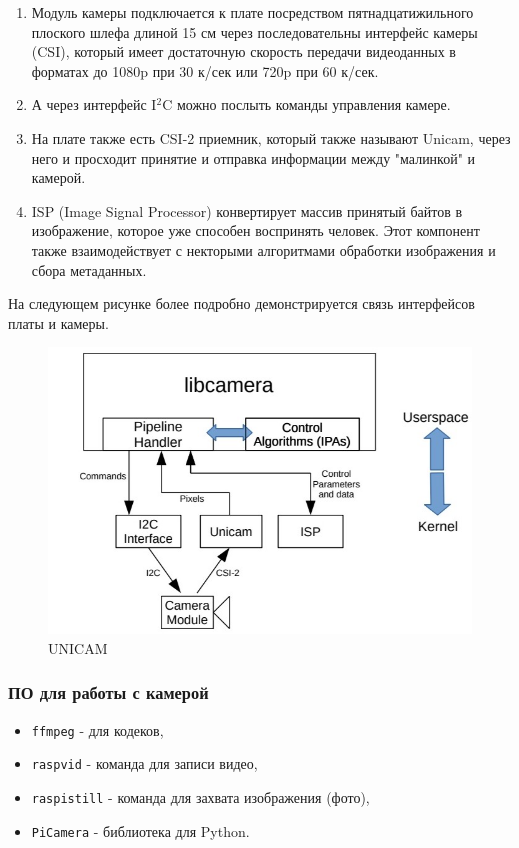 \documentclass[a4paper,11pt]{article}
\begin{document}
\begin{enumerate}
  \item Модуль камеры подключается к плате посредством пятнадцатижильного плоского шлефа длиной 15 см через последовательны интерфейс камеры (CSI), который имеет достаточную скорость передачи видеоданных в форматах до 1080p при 30 к/сек или 720p при 60 к/сек.
  \item А через интерфейс I$^2$C можно послыть команды управления камере.
  \item На плате также есть CSI-2 приемник, который также называют Unicam, через него и просходит принятие и отправка информации между "малинкой" и камерой.
  \item ISP (Image Signal Processor) конвертирует массив принятый байтов в изображение, которое уже способен воспринять человек. Этот компонент также взаимодействует с некторыми алгоритмами обработки изображения и сбора метаданных.
\end{enumerate}

На следующем рисунке более подробно демонстрируется связь интерфейсов платы и камеры.
\begin{figure}[h!]
  \begin{center}
    \includegraphics[scale=0.5]{images/рис_15.jpg}
  \caption{UNICAM}
  \end{center}
\end{figure}

\subsubsection{ПО для работы с камерой}
\begin{itemize}
  \item \verb|ffmpeg| - для кодеков,
  \item \verb|raspvid| - команда для записи видео,
  \item \verb|raspistill| - команда для захвата изображения (фото),
  \item \verb|PiCamera| - библиотека для Python. 
\end{itemize}
\end{document}

